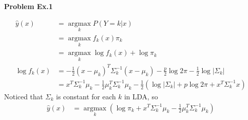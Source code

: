 \documentclass[UTF8,12pt]{article}
\newenvironment{problem}[2][Problem]
{ \begin{mdframed}[backgroundcolor=gray!20] \textbf{#1 #2}}
	{  \end{mdframed}}
\newenvironment{answer}
{}
{}
\newenvironment{eq}
{
	\begin{equation}
		\begin{aligned}\nonumber
}
{
		\end{aligned}
	\end{equation}
}
\begin{document}
\renewcommand{\qed}{\quad\qedsymbol}
\begin{problem}{Ex.1}
\end{problem}
\begin{answer}
\begin{eq}
	\hat{y}(x)&=\mathop{argmax}\limits_{k} P(Y=k|x)\\
	&= \mathop{argmax}\limits_{k} f_k(x)\pi_k\\
	&= \mathop{argmax}\limits_{k} \log{f_k(x)}+\log{\pi_k}\\
	\log{f_k(x)}&=-\frac{1}{2}(x-\mu_k)^T\Sigma_k^{-1}(x-\mu_k)
	-\frac{p}{2}\log{2\pi}-\frac{1}{2}\log{|\Sigma_k|}\\
	&= x^T\Sigma^{-1}_k\mu_k - \frac{1}{2}\mu_k^T \Sigma_k^{-1}\mu_k
	-\frac{1}{2}(\log{|\Sigma_k|}+p\log{2\pi}+x^T\Sigma^{-1}_k x)
\end{eq}
Noticed that $\Sigma_k$ is constant for each $k$ in LDA, so
\begin{eq}
	\hat{y}(x)&=\mathop{argmax}\limits_{k} (\log{\pi_k} +
	x^T\Sigma^{-1}_k\mu_k - \frac{1}{2}\mu_k^T \Sigma_k^{-1}\mu_k)
\end{eq}
\end{answer}
\end{document}
